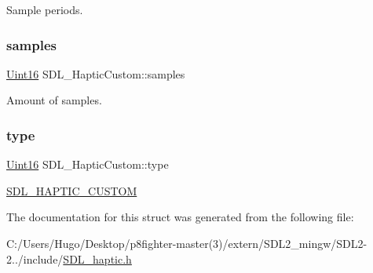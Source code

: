 Sample periods. \mbox{\label{struct_s_d_l___haptic_custom_a5905ea1b6182da846535ca8c80b4fa33}} 
\subsubsection{\texorpdfstring{samples}{samples}}
{\footnotesize\ttfamily \hyperlink{_s_d_l__stdinc_8h_a31fcc0a076c9068668173ee26d33e42b}{Uint16} S\+D\+L\+\_\+\+Haptic\+Custom\+::samples}

Amount of samples. \mbox{\label{struct_s_d_l___haptic_custom_a98a8995c94492069dc007502ed97eed2}} 
\subsubsection{\texorpdfstring{type}{type}}
{\footnotesize\ttfamily \hyperlink{_s_d_l__stdinc_8h_a31fcc0a076c9068668173ee26d33e42b}{Uint16} S\+D\+L\+\_\+\+Haptic\+Custom\+::type}

\hyperlink{_s_d_l__haptic_8h_a8a18c4de1076ac9bebd718329d16db29}{S\+D\+L\+\_\+\+H\+A\+P\+T\+I\+C\+\_\+\+C\+U\+S\+T\+OM} 

The documentation for this struct was generated from the following file\+:\begin{DoxyCompactItemize}
\item 
C\+:/\+Users/\+Hugo/\+Desktop/p8fighter-\/master(3)/extern/\+S\+D\+L2\+\_\+mingw/\+S\+D\+L2-\/2../include/\hyperlink{_s_d_l__haptic_8h}{S\+D\+L\+\_\+haptic.\+h}\end{DoxyCompactItemize}
